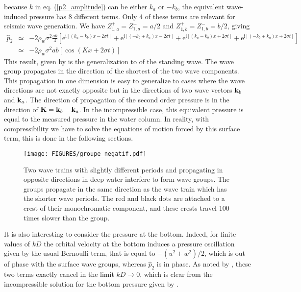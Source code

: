 because  $k$ in eq. (\ref{p2_amplitude}) can be  either $k_a$ or $-k_b$, the equivalent wave-induced pressure has 8 different terms. Only  
4 of these terms are relevant for seismic wave generation. We have $Z_{1,a}^{+}=Z_{1,a}^{-}=a/2$ and  $Z_{1,b}^{+}=Z_{1,b}^{-}=b/2$,  giving
\begin{eqnarray}
     \widehat{p}_{2} &\simeq & -2 \rho_w \sigma^2 \frac{ab}{4}
     \left[ \mathrm{e}^{\mathrm{i}  \left[( k_a - k_b) x - 2  \sigma   t\right]}
          + \mathrm{e}^{\mathrm{i} \left[( -k_b + k_a) x - 2  \sigma t\right]} 
           + \mathrm{e}^{\mathrm{i}  \left[( k_a - k_b) x + 2  \sigma   t\right]}
          + \mathrm{e}^{\mathrm{i} \left[( -k_b + k_a) x + 2  \sigma t\right]} 
\right] \nonumber \\
&\simeq &  -2 \rho_w \sigma^2 ab
     \left[ \cos\left(K x + 2  \sigma   t\right) \right] \nonumber 
\end{eqnarray}
This result, given by \cite{Ardhuin&Herbers2013} is the generalization to of the  \cite{Longuet-Higgins1950} standing wave. The wave group 
propagates in the direction of the shortest of the two wave components. 
This propagation in one dimension  is easy to generalize to cases where the wave directions are not exactly opposite but in the directions of two wave vectors $\mathbf{k}_b$ and $\mathbf{k}_a$. 
The direction of propagation of the second order pressure is in the direction of  $\mathbf{K}=\mathbf{k}_b-\mathbf{k}_a$. In the incompressible case, this equivalent pressure 
is equal to the measured pressure in the water column. In reality, with compressibility we have to solve the equations of motion forced by this surface term, this 
is done in the following sections. 
\begin{figure}[ht]
\centerline{\texttt{[image: FIGURES/groupe\_negatif.pdf]}}
  \caption{Two wave trains with slightly different periods and propagating in opposite directions in deep water interfere to 
  form wave groups. The groups propagate in the same direction as the wave train which has the shorter wave  periods. 
  The red and black dots are attached to a crest of their monochromatic component, and these crests travel 100 times slower than the group.}
\label{fig:group_negative}
\end{figure}

It is also interesting to consider the pressure at the bottom. Indeed, for finite values of $kD$ the orbital velocity at the bottom 
induces a pressure oscillation given by the usual Bernoulli term,  that is equal to $-(u^2+w^2)/2$, which is out of phase with the surface wave groups, whereas 
$\widehat{p}_{2}$ is in phase. As noted by \cite{Ardhuin&Herbers2013}, these two terms exactly cancel in the limit $kD \rightarrow 0$, which is clear 
from the incompressible solution for the bottom pressure given by \cite{Herbers&Guza1991}.

